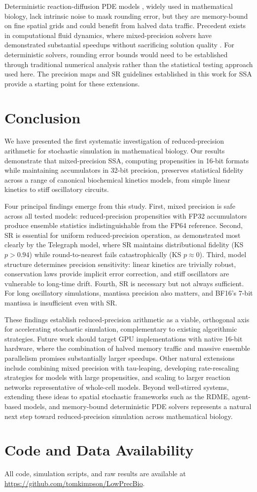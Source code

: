 \documentclass{article}
\begin{document}
Deterministic reaction-diffusion PDE models \cite{hundsdorfer2003}, widely used in mathematical biology, lack intrinsic noise to mask rounding error, but they are memory-bound on fine spatial grids and could benefit from halved data traffic. Precedent exists in computational fluid dynamics, where mixed-precision solvers have demonstrated substantial speedups without sacrificing solution quality \cite{openfoamFP2023}. For deterministic solvers, rounding error bounds would need to be established through traditional numerical analysis rather than the statistical testing approach used here. The precision maps and SR guidelines established in this work for SSA provide a starting point for these extensions.

\section{Conclusion}
\label{sec:conclusion}

We have presented the first systematic investigation of reduced-precision arithmetic for stochastic simulation in mathematical biology. Our results demonstrate that mixed-precision SSA, computing propensities in 16-bit formats while maintaining accumulators in 32-bit precision, preserves statistical fidelity across a range of canonical biochemical kinetics models, from simple linear kinetics to stiff oscillatory circuits.

Four principal findings emerge from this study. First, mixed precision is safe across all tested models: reduced-precision propensities with FP32 accumulators produce ensemble statistics indistinguishable from the FP64 reference. Second, SR is essential for uniform reduced-precision operation, as demonstrated most clearly by the Telegraph model, where SR maintains distributional fidelity (KS $p > 0.94$) while round-to-nearest fails catastrophically (KS $p \approx 0$). Third, model structure determines precision sensitivity: linear kinetics are trivially robust, conservation laws provide implicit error correction, and stiff oscillators are vulnerable to long-time drift. Fourth, SR is necessary but not always sufficient. For long oscillatory simulations, mantissa precision also matters, and BF16's 7-bit mantissa is insufficient even with SR.

These findings establish reduced-precision arithmetic as a viable, orthogonal axis for accelerating stochastic simulation, complementary to existing algorithmic strategies. Future work should target GPU implementations with native 16-bit hardware, where the combination of halved memory traffic and massive ensemble parallelism promises substantially larger speedups. Other natural extensions include combining mixed precision with tau-leaping, developing rate-rescaling strategies for models with large propensities, and scaling to larger reaction networks representative of whole-cell models. Beyond well-stirred systems, extending these ideas to spatial stochastic frameworks such as the RDME, agent-based models, and memory-bound deterministic PDE solvers represents a natural next step toward reduced-precision simulation across mathematical biology.

\section*{Code and Data Availability}

All code, simulation scripts, and raw results are available at \url{https://github.com/tomkimpson/LowPrecBio}. 



\end{document}
